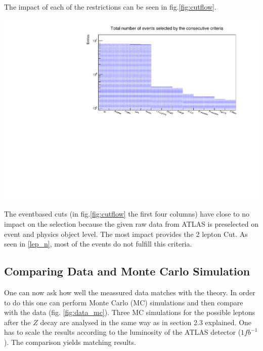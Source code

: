 \documentclass[12pt, a4paper, bibliography=totoc]{scrartcl}
\begin{document}
\begin{multicols}{2}
The impact of each of the restrictions can be seen in fig.\ref{fig:cutflow}. 
\begin{center}
	\includegraphics[width=\linewidth]{fig/cutflow.pdf}
	\label{fig:cutflow}
\end{center}
The eventbased cuts (in fig.\ref{fig:cutflow} the first four columns) have close to no impact on the selection because the given raw data from ATLAS is preselected on event and physics object level.
The most impact provides the 2 lepton Cut. As seen in \ref{lep_n}, most of the events do not fulfill this criteria.


\subsection{Comparing Data and Monte Carlo Simulation}
One can now ask how well the meassured data matches with the theory. 
In order to do this one can perform Monte Carlo (MC) simulations and then compare with the data (fig. \ref{fig:data_mc}). 
Three MC simulations for the possible leptons after the $Z$ decay are analysed in the same way as in section 2.3 explained. One has to scale the results according to the luminosity of the ATLAS detector ($1 fb^{-1}$).
The comparison yields matching results.


\end{multicols}
\end{document}
